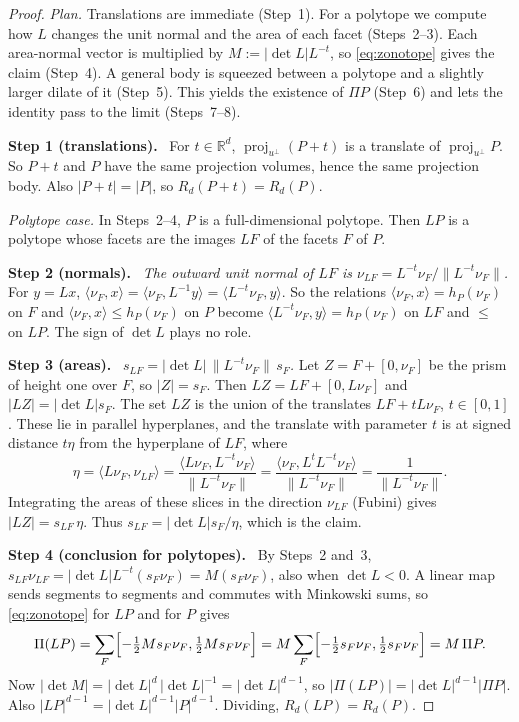 \documentclass[11pt]{article}
\newcommand{\R}{\mathbb R}
\DeclareMathOperator{\proj}{proj}
\newcommand{\step}[1]{\par\smallskip\noindent\textbf{#1}\ }
\begin{document}
\begin{proof}
\emph{Plan.} Translations are immediate (Step~1). For a polytope we compute
how \(L\) changes the unit normal and the area of each facet (Steps~2--3).
Each area-normal vector is multiplied by \(M:=|\det L|L^{-t}\), so
\eqref{eq:zonotope} gives the claim (Step~4). A general body is squeezed
between a polytope and a slightly larger dilate of it (Step~5). This yields
the existence of \(\Pi P\) (Step~6) and lets the identity pass to the limit
(Steps~7--8).

\step{Step 1 (translations).} For \(t\in\R^d\),
\(\proj_{u^\perp}(P+t)\) is a translate of \(\proj_{u^\perp}P\). So \(P+t\)
and \(P\) have the same projection volumes, hence the same projection body.
Also \(|P+t|=|P|\), so \(R_d(P+t)=R_d(P)\).

\medskip\noindent\emph{Polytope case.} In Steps~2--4, \(P\) is a
full-dimensional polytope. Then \(LP\) is a polytope whose facets are the
images \(LF\) of the facets \(F\) of \(P\).

\step{Step 2 (normals).}
\emph{The outward unit normal of \(LF\) is
\(\nu_{LF}=L^{-t}\nu_F/\|L^{-t}\nu_F\|\).}
For \(y=Lx\),
\(\langle\nu_F,x\rangle=\langle\nu_F,L^{-1}y\rangle
=\langle L^{-t}\nu_F,y\rangle\). So the relations
\(\langle\nu_F,x\rangle=h_P(\nu_F)\) on \(F\) and
\(\langle\nu_F,x\rangle\le h_P(\nu_F)\) on \(P\) become
\(\langle L^{-t}\nu_F,y\rangle=h_P(\nu_F)\) on \(LF\) and \(\le\) on
\(LP\). The sign of \(\det L\) plays no role.

\step{Step 3 (areas).}
\emph{\(s_{LF}=|\det L|\,\|L^{-t}\nu_F\|\,s_F\).}
Let \(Z=F+[0,\nu_F]\) be the prism of height one over \(F\), so
\(|Z|=s_F\). Then \(LZ=LF+[0,L\nu_F]\) and \(|LZ|=|\det L|s_F\). The set
\(LZ\) is the union of the translates \(LF+tL\nu_F\), \(t\in[0,1]\). These
lie in parallel hyperplanes, and the translate with parameter \(t\) is at
signed distance \(t\eta\) from the hyperplane of \(LF\), where
\[
 \eta=\langle L\nu_F,\nu_{LF}\rangle
 =\frac{\langle L\nu_F,L^{-t}\nu_F\rangle}{\|L^{-t}\nu_F\|}
 =\frac{\langle\nu_F,L^{t}L^{-t}\nu_F\rangle}{\|L^{-t}\nu_F\|}
 =\frac{1}{\|L^{-t}\nu_F\|}.
\]
Integrating the areas of these slices in the direction \(\nu_{LF}\)
(Fubini) gives \(|LZ|=s_{LF}\,\eta\). Thus
\(s_{LF}=|\det L|s_F/\eta\), which is the claim.

\step{Step 4 (conclusion for polytopes).} By Steps~2 and~3,
\(s_{LF}\nu_{LF}=|\det L|L^{-t}(s_F\nu_F)=M(s_F\nu_F)\), also when
\(\det L<0\). A linear map sends segments to segments and commutes with
Minkowski sums, so \eqref{eq:zonotope} for \(LP\) and for \(P\) gives
\[
 \Pi(LP)=\sum_F\Bigl[-\tfrac12Ms_F\nu_F,\tfrac12Ms_F\nu_F\Bigr]
 =M\sum_F\Bigl[-\tfrac12s_F\nu_F,\tfrac12s_F\nu_F\Bigr]=M\,\Pi P.
\]
Now \(|\det M|=|\det L|^d\,|\det L|^{-1}=|\det L|^{d-1}\), so
\(|\Pi(LP)|=|\det L|^{d-1}|\Pi P|\). Also
\(|LP|^{d-1}=|\det L|^{d-1}|P|^{d-1}\). Dividing, \(R_d(LP)=R_d(P)\).


\end{proof}
\end{document}
